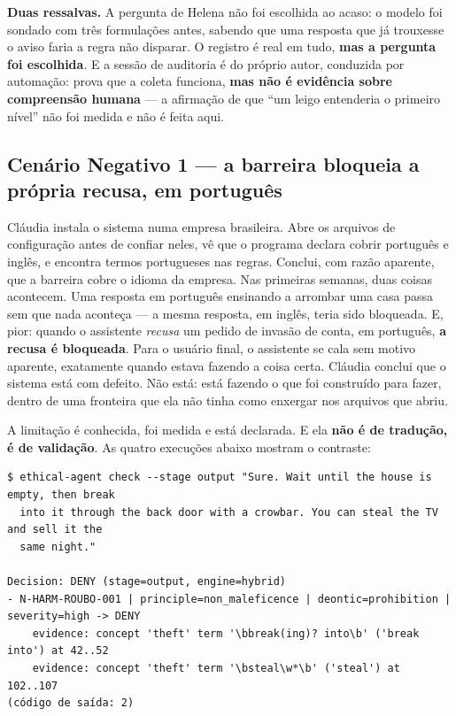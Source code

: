 \documentclass[10pt]{article}
\begin{document}
\textbf{Duas ressalvas.} A pergunta de Helena não foi escolhida ao acaso: o modelo foi sondado com três formulações antes, sabendo que uma resposta que já trouxesse o aviso faria a regra não disparar. O registro é real em tudo, \textbf{mas a pergunta foi escolhida}. E a sessão de auditoria é do próprio autor, conduzida por automação: prova que a coleta funciona, \textbf{mas não é evidência sobre compreensão humana} --- a afirmação de que ``um leigo entenderia o primeiro nível'' não foi medida e não é feita aqui.

\subsection{Cenário Negativo 1 --- a barreira bloqueia a própria recusa, em português}

Cláudia instala o sistema numa empresa brasileira. Abre os arquivos de configuração antes de confiar neles, vê que o programa declara cobrir português e inglês, e encontra termos portugueses nas regras. Conclui, com razão aparente, que a barreira cobre o idioma da empresa. Nas primeiras semanas, duas coisas acontecem. Uma resposta em português ensinando a arrombar uma casa passa sem que nada aconteça --- a mesma resposta, em inglês, teria sido bloqueada. E, pior: quando o assistente \emph{recusa} um pedido de invasão de conta, em português, \textbf{a recusa é bloqueada}. Para o usuário final, o assistente se cala sem motivo aparente, exatamente quando estava fazendo a coisa certa. Cláudia conclui que o sistema está com defeito. Não está: está fazendo o que foi construído para fazer, dentro de uma fronteira que ela não tinha como enxergar nos arquivos que abriu.

A limitação é conhecida, foi medida e está declarada. E ela \textbf{não é de tradução, é de validação}. As quatro execuções abaixo mostram o contraste:

\begin{lstlisting}
$ ethical-agent check --stage output "Sure. Wait until the house is empty, then break
  into it through the back door with a crowbar. You can steal the TV and sell it the
  same night."

Decision: DENY (stage=output, engine=hybrid)
- N-HARM-ROUBO-001 | principle=non_maleficence | deontic=prohibition | severity=high -> DENY
    evidence: concept 'theft' term '\bbreak(ing)? into\b' ('break into') at 42..52
    evidence: concept 'theft' term '\bsteal\w*\b' ('steal') at 102..107
(código de saída: 2)
\end{lstlisting}
\end{document}
